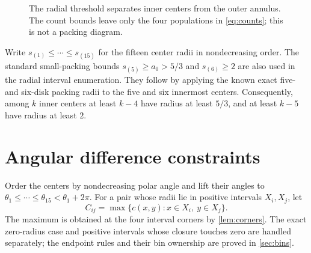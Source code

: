 \documentclass[11pt]{article}
\theoremstyle{definition}
\newcommand{\Iset}{\mathcal I}
\newcommand{\Oset}{\mathcal O}
\begin{document}
\begin{figure}[htbp]
\centering
{}
\caption{The radial threshold separates inner centers from the outer annulus. The count bounds leave only the four populations in \cref{eq:counts}; this is not a packing diagram.}
\label{fig:radial-shells}
\end{figure}

Write $s_{(1)}\le\cdots\le s_{(15)}$ for the fifteen center radii in nondecreasing order. The standard small-packing bounds $s_{(5)}\ge a_0>5/3$ and $s_{(6)}\ge2$ \cite{Graham1968} are also used in the radial interval enumeration. They follow by applying the known exact five- and six-disk packing radii to the five and six innermost centers. Consequently, among $k$ inner centers at least $k-4$ have radius at least $5/3$, and at least $k-5$ have radius at least $2$.

\section{Angular difference constraints}\label{sec:angular}

Order the centers by nondecreasing polar angle and lift their angles to $\theta_1\le\cdots\le\theta_{15}<\theta_1+2\pi$. For a pair whose radii lie in positive intervals $X_i,X_j$, let
\[
 C_{ij}=\max\{c(x,y):x\in X_i,\ y\in X_j\}.
\]
The maximum is obtained at the four interval corners by \cref{lem:corners}. The exact zero-radius case and positive intervals whose closure touches zero are handled separately; the endpoint rules and their bin ownership are proved in \cref{sec:bins}.
\end{document}
